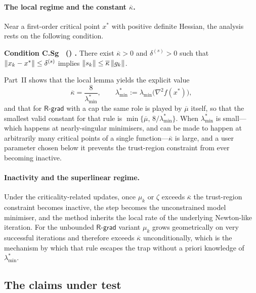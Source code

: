 \documentclass[11pt]{article}
\makeatletter
\theoremstyle{plain}
\theoremstyle{definition}
\theoremstyle{remark}
\newcommand{\pIII@head}[3]{%
  \par\addvspace{\topsep}%
  \noindent
  \def\@currentlabel{#2}%
  {\normalfont\bfseries #1 #2%
    \if\relax\detokenize{#3}\relax\else
      \normalfont\ (#3)%
    \fi
    \normalfont\bfseries.}%
  \nobreak\hspace{.5em}\ignorespaces
}
\newenvironment{cond}[2][]{\pIII@head{Condition}{#2}{#1}}{\par\addvspace{\topsep}}
\numberwithin{equation}{section}
\providecommand{\defeq}{\mathrel{:=}}
\newcommand{\Rgrad}{\textsf{R-grad}}
\makeatother
\begin{document}
\paragraph{The local regime and the constant $\overline{\kappa}$.}
Near a first-order critical point $x^*$ with positive definite Hessian, the analysis rests on
the following condition.

\begin{cond}{C.Sg}[step bounded by the gradient]
\label{cond: s bounded by g}
There exist $\overline{\kappa} > 0$ and $\delta^{(s)} > 0$ such that
$\left \lVert x_k - x^* \right \rVert \leq \delta^{(s)}$ implies $\left \lVert s_k \right \rVert \leq \overline{\kappa} \left \lVert g_k \right \rVert$.
\end{cond}

Part~II shows that the local lemma yields the explicit value
\begin{equation}
  \overline{\kappa} = \frac{8}{\lambda^*_{\min}},
  \qquad \lambda^*_{\min} \defeq \lambda_{\min}\bigl(\nabla^2 f(x^*)\bigr),
  \label{eqn: kappa}
\end{equation}
and that for $\Rgrad$ with a cap the same role is played by $\overline{\mu}$ itself, so that
the smallest valid constant for that rule is $\min\{\overline{\mu},\, 8/\lambda^*_{\min}\}$.
When $\lambda^*_{\min}$ is small---which happens at nearly-singular minimisers, and can be made
to happen at arbitrarily many critical points of a single
function---$\overline{\kappa}$ is large, and a user parameter chosen below it prevents the
trust-region constraint from ever becoming inactive.

\paragraph{Inactivity and the superlinear regime.}
Under the criticality-related updates, once $\mu_k$ or $\zeta$ exceeds $\overline{\kappa}$ the
trust-region constraint becomes inactive, the step becomes the unconstrained model minimiser,
and the method inherits the local rate of the underlying Newton-like iteration. For the
unbounded $\Rgrad$ variant $\mu_k$ grows geometrically on very successful iterations and
therefore exceeds $\overline{\kappa}$ unconditionally, which is the mechanism by which that
rule escapes the trap without a priori knowledge of $\lambda^*_{\min}$.

\subsection{The claims under test}
\label{sec: claims}
\end{document}
